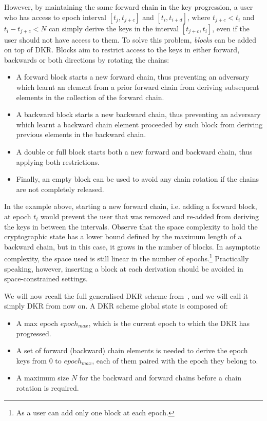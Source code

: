 However, by maintaining the same forward chain in the key progression,
a user who has access to epoch interval 
$[t_j, t_{j + c}]$ and $[t_i, t_{i + d}]$, 
where $t_{j + c} < t_i$ and $t_i - t_{j + c} < N$  
can simply derive the keys in the interval $[t_{j + c}, t_i]$, even if 
the user should not have access to them.
To solve this problem, \textit{blocks} can be added on top of DKR.
Blocks aim to restrict access to the keys in either forward, backwards
or both directions by rotating the chains:
\begin{itemize}
    \item A forward block starts a new forward chain, thus preventing an adversary which learnt an element from a prior forward chain from deriving subsequent elements in the collection of the forward chain. 
    \item A backward block starts a new backward chain, thus preventing an adversary which learnt a backward chain element proceeded by such block from deriving previous elements in the backward chain.
    \item A double or full block starts both a new forward and backward chain, thus applying both restrictions.
    \item Finally, an empty block can be used to avoid any chain rotation if the chains are not completely released.
\end{itemize} 
In the example above, starting a new forward chain, i.e. adding a forward block,
at epoch $t_i$ would prevent the user that was removed and re-added from deriving the keys in between 
the intervals. Observe that the space complexity to hold the cryptographic
state has a lower bound defined by the maximum length of a backward chain,
but in this case, it grows in the number of blocks. In asymptotic
complexity, the space used is still linear in the number of epochs.\footnote{As a user can add only one block at each epoch.}
Practically speaking, however, inserting a block at each derivation
should be avoided in space-constrained settings.


We will now recall the full generalised DKR scheme from~\cite{GKP}, and we will call it simply DKR from now on. 
A DKR scheme global state is composed of:
\begin{itemize}
    \item A max epoch $epoch_{max}$, which is the current epoch to which the DKR has progressed.
    \item A set of forward (backward) chain elements is needed to derive the epoch keys from 0 to $epoch_{max}$, each of them paired with the epoch they belong to.
    \item A maximum size $N$ for the backward and forward chains before a chain rotation is required.
\end{itemize}

